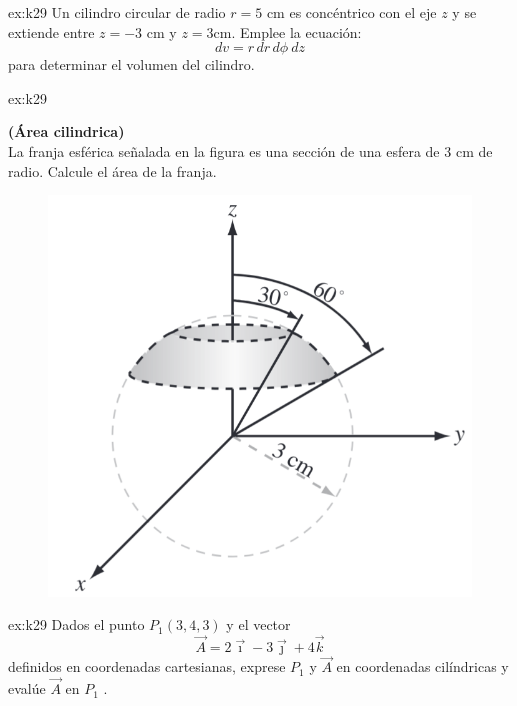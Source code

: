 \begin{multicols}{2}
    \begin{excercise}[][][$V=471.2\, \rm{cm^3}$]{ex:k29}{ 
            Un cilindro circular de radio $r=5$ cm  es concéntrico con el eje $z$ y se extiende entre $z=-3$ cm y $z=3$cm. Emplee la ecuación:
            \begin{equation*}
                dv=r\,dr\,d\phi\ dz
            \end{equation*}
            para determinar el volumen del cilindro. 
         }
    \end{excercise}

    \begin{excercise}[][][$S=20.7\, \rm{cm^2}$]{ex:k29}{ \textbf{(Área cilindrica)}\\
            La franja esférica señalada en la figura es una sección de una esfera de $3$ cm de radio. Calcule el área de la franja.           
            \begin{figure}[H]
                \centering
                \includegraphics[width=0.8\linewidth]{img/01_electric-field/3.png}
            \end{figure}
         }
    \end{excercise}

    \begin{excercise}[][][$P_1=P_1(5, 306.9^\circ, 3)$; $\vec{A}=3.6\vec{e}_r-0.2\vec{e}_\phi+4\vec{k}$]{ex:k29}{ 
            Dados el punto $P_1 (3, 4, 3)$ y el vector
            \begin{equation*}
                \vec{A}=2\vec{\imath}-3\vec{\jmath} +4\vec{k}
            \end{equation*}
            definidos en coordenadas cartesianas, exprese $P_1$ y $\vec{A}$ en coordenadas cilíndricas y evalúe $\vec{A}$ en $P_1$ .
         }
    \end{excercise}


\end{multicols}
